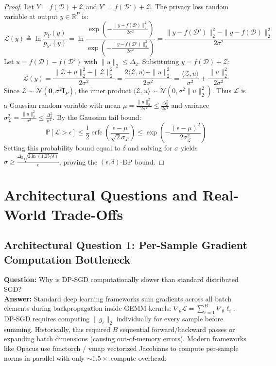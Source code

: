 \documentclass[11pt,a4paper]{article}
\theoremstyle{definition}
\begin{document}
\begin{proof}
Let $Y = f(\mathcal{D}) + \mathcal{Z}$ and $Y' = f(\mathcal{D}') + \mathcal{Z}$. The privacy loss random variable at output $y \in \mathbb{R}^P$ is:
\begin{equation}
\mathcal{L}(y) \triangleq \ln \frac{p_Y(y)}{p_{Y'}(y)} = \ln \frac{\exp\left(-\frac{\|y - f(\mathcal{D})\|_2^2}{2\sigma^2}\right)}{\exp\left(-\frac{\|y - f(\mathcal{D}')\|_2^2}{2\sigma^2}\right)} = \frac{\|y - f(\mathcal{D}')\|_2^2 - \|y - f(\mathcal{D})\|_2^2}{2\sigma^2}
\end{equation}
Let $u = f(\mathcal{D}) - f(\mathcal{D}')$ with $\|u\|_2 \le \Delta_2$. Substituting $y = f(\mathcal{D}) + \mathcal{Z}$:
\begin{equation}
\mathcal{L}(y) = \frac{\|\mathcal{Z} + u\|_2^2 - \|\mathcal{Z}\|_2^2}{2\sigma^2} = \frac{2 \langle \mathcal{Z}, u \rangle + \|u\|_2^2}{2\sigma^2} = \frac{\langle \mathcal{Z}, u \rangle}{\sigma^2} + \frac{\|u\|_2^2}{2\sigma^2}
\end{equation}
Since $\mathcal{Z} \sim \mathcal{N}(\mathbf{0}, \sigma^2 \mathbf{I}_P)$, the inner product $\langle \mathcal{Z}, u \rangle \sim \mathcal{N}(0, \sigma^2 \|u\|_2^2)$.
Thus $\mathcal{L}$ is a Gaussian random variable with mean $\mu = \frac{\|u\|_2^2}{2\sigma^2} \le \frac{\Delta_2^2}{2\sigma^2}$ and variance $\sigma_{\mathcal{L}}^2 = \frac{\|u\|_2^2}{\sigma^2} \le \frac{\Delta_2^2}{\sigma^2}$.
By the Gaussian tail bound:
\begin{equation}
\mathbb{P}\left[ \mathcal{L} > \epsilon \right] \le \frac{1}{2} \operatorname{erfc}\left( \frac{\epsilon - \mu}{\sqrt{2} \sigma_{\mathcal{L}}} \right) \le \exp\left( -\frac{(\epsilon - \mu)^2}{2 \sigma_{\mathcal{L}}^2} \right)
\end{equation}
Setting this probability bound equal to $\delta$ and solving for $\sigma$ yields $\sigma \ge \frac{\Delta_2 \sqrt{2 \ln(1.25/\delta)}}{\epsilon}$, proving the $(\epsilon, \delta)$-DP bound.
\end{proof}

\section{Architectural Questions and Real-World Trade-Offs}

\subsection{Architectural Question 1: Per-Sample Gradient Computation Bottleneck}
\textbf{Question:} Why is DP-SGD computationally slower than standard distributed SGD?\\
\textbf{Answer:} Standard deep learning frameworks sum gradients across all batch elements during backpropagation inside GEMM kernels: $\nabla_\theta \mathcal{L} = \sum_{i=1}^B \nabla_\theta \ell_i$. DP-SGD requires computing $\|g_i\|_2$ individually for every sample before summing. Historically, this required $B$ sequential forward/backward passes or expanding batch dimensions (causing out-of-memory errors). Modern frameworks like Opacus use functorch / vmap vectorized Jacobians to compute per-sample norms in parallel with only $\sim 1.5\times$ compute overhead.
\end{document}
